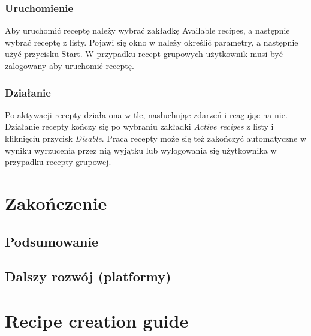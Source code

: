 \documentclass[11pt,a4paper,polish,thesis]{dcsbook}
\begin{document}
\subsection{Uruchomienie}
Aby uruchomić receptę należy wybrać zakładkę Available recipes, a następnie wybrać receptę z listy. Pojawi się okno w należy określić parametry, a następnie użyć przycisku Start. W przypadku recept grupowych użytkownik musi być zalogowany aby uruchomić receptę.
\subsection{Działanie}
Po aktywacji recepty działa ona w tle, nasłuchując zdarzeń i reagując na nie. Działanie recepty kończy się po wybraniu zakładki \emph{Active recipes} z listy i
kliknięciu przycisk \emph{Disable}. Praca recepty może się też zakończyć automatyczne w wyniku wyrzucenia przez nią wyjątku lub wylogowania się użytkownika w
przypadku recepty grupowej.

\chapter{Zakończenie}
\section{Podsumowanie}
\section{Dalszy rozwój (platformy)}

\appendix 

\chapter{Recipe creation guide}
\end{document}

